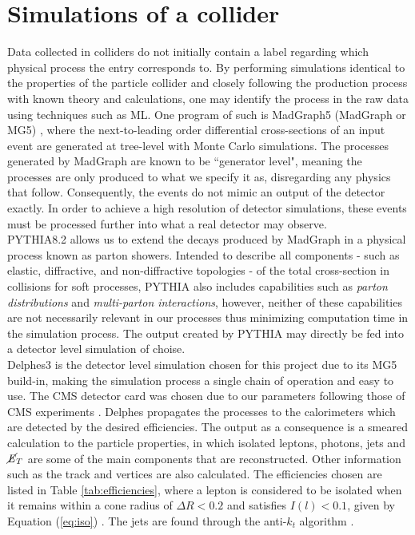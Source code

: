 \section{Simulations of a collider}
\label{sec:Sims}
Data collected in colliders do not initially contain a label regarding which physical process the entry corresponds to. By performing simulations identical to the properties of the particle collider and closely following the production process with known theory and calculations, one may identify the process in the raw data using techniques such as ML. One program of such is MadGraph5 (MadGraph or MG5) \cite{alwall2014automated, alwall2011madgraph}, where the next-to-leading order differential cross-sections of an input event are generated at tree-level with Monte Carlo simulations. The processes generated by MadGraph are known to be ``generator level", meaning the processes are only produced to what we specify it as, disregarding any physics that follow. Consequently, the events do not mimic an output of the detector exactly. In order to achieve a high resolution of detector simulations, these events must be processed further into what a real detector may observe. \\

PYTHIA8.2 \cite{sjostrand2015introduction} allows us to extend the decays produced by MadGraph in a physical process known as parton showers. Intended to describe all components - such as elastic, diffractive, and non-diffractive topologies - of the total cross-section in collisions for soft processes, PYTHIA also includes capabilities such as \textit{parton distributions} and \textit{multi-parton interactions}, however, neither of these capabilities are not necessarily relevant in our processes thus minimizing computation time in the simulation process. The output created by PYTHIA may directly be fed into a detector level simulation of choise. \\

Delphes3 \cite{de2014delphes} is the detector level simulation chosen for this project due to its MG5 build-in, making the simulation process a single chain of operation and easy to use. The CMS detector card was chosen due to our parameters following those of CMS experiments \cite{cms2019search, cms2016searches, cms2017search}. Delphes propagates the processes to the calorimeters which are detected by the desired efficiencies. The output as a consequence is a smeared calculation to the particle properties, in which isolated leptons, photons, jets and $\cancel{\it{E}}_{T}$ are some of the main components that are reconstructed. Other information such as the track and vertices are also calculated. The efficiencies chosen are listed in Table \ref{tab:efficiencies}, where a lepton is considered to be isolated when it remains within a cone radius of $\Delta R <0.2$ and satisfies $I(l)<0.1$, given by Equation (\ref{eq:iso}) \cite{de2014delphes}. The jets are found through the anti-$k_t$ algorithm \cite{cacciari2008anti}. \\


